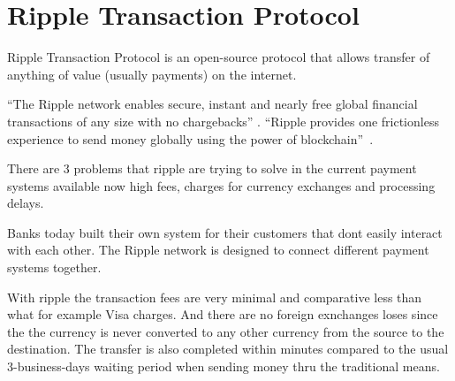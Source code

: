 \section{Ripple Transaction Protocol}

Ripple Transaction Protocol is an open-source protocol that allows
transfer of anything of value (usually payments) on the internet.

``The Ripple network enables secure, instant and nearly free global
financial transactions of any size with no chargebacks''
\cite{hid-sp18-506-RippleNetwork}.  ``Ripple provides one frictionless
experience to send money globally using the power of
blockchain''~\cite{hid-sp18-506-GlobalPayment}.


There are 3 problems that ripple are trying to solve in the current
payment systems available now high fees, charges for currency
exchanges and processing delays.

Banks today built their own system for their customers that dont
easily interact with each other.  The Ripple network is designed to
connect different payment systems together.

With ripple the transaction fees are very minimal and comparative less
than what for example Visa charges. And there are no foreign
exnchanges loses since the the currency is never converted to any
other currency from the source to the destination. The transfer is
also completed within minutes compared to the usual 3-business-days
waiting period when sending money thru the traditional means.
